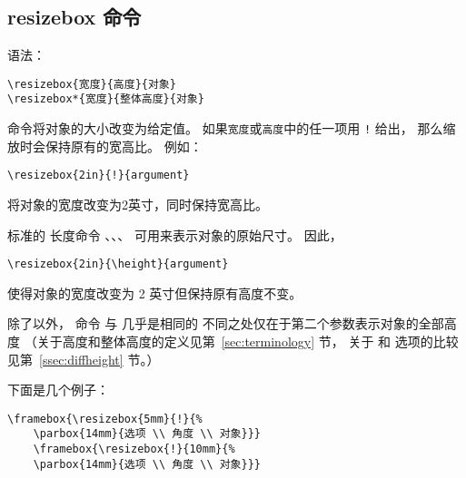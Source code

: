 \subsection{resizebox 命令}\label{ssec:resizebox}
语法：
\begin{lstlisting}
\resizebox{宽度}{高度}{对象}
\resizebox*{宽度}{整体高度}{对象}
\end{lstlisting}

 命令将对象的大小改变为给定值。
如果\texttt{宽度}或\texttt{高度}中的任一项用 \texttt{!} 给出，
那么缩放时会保持原有的宽高比。
例如：
\begin{lstlisting}
\resizebox{2in}{!}{argument}
\end{lstlisting}
将对象的宽度改变为2英寸，同时保持宽高比。

标准的 \LaTeXe{} 长度命令 、、、 可用来表示对象的原始尺寸。
因此，
\begin{lstlisting}
\resizebox{2in}{\height}{argument}
\end{lstlisting}
使得对象的宽度改变为 2 英寸但保持原有高度不变。 

除了以外，
命令  与  几乎是相同的
不同之处仅在于第二个参数表示对象的全部高度
（关于高度和整体高度的定义见第~\ref{sec:terminology} 节，
关于  和  选项的比较见第~\ref{ssec:diffheight} 节。）

下面是几个例子：

\hspace{-1.5cm}\begin{minipage}[b]{.5\textwidth}
	\begin{center}
		\par\vspace{0pt}
	\end{center}
\end{minipage}%
\hspace{-1cm}\begin{minipage}[b]{.5\textwidth}
	\begin{Verbatim}[formatcom=\color{VerbatimColor}\CJKfamily{kai}]
	\framebox{\resizebox{5mm}{!}{%
	\parbox{14mm}{选项 \\ 角度 \\ 对象}}}
	\framebox{\resizebox{!}{10mm}{%
	\parbox{14mm}{选项 \\ 角度 \\ 对象}}}
	\end{Verbatim}
	\par\vspace{0pt}
\end{minipage}

